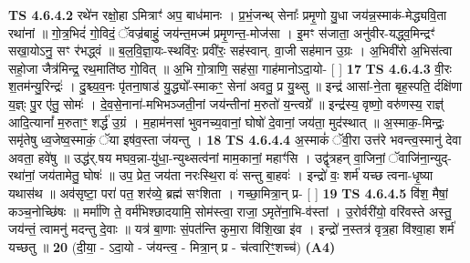 \documentclass[17pt]{extarticle}
\begin{document}
                  \newline
                                \textbf{ TS 4.6.4.2} \newline
                  रथे॑न रक्षो॒हा ऽमित्राꣳ॑ अप॒ बाध॑मानः । प्र॒भं॒जन्थ् सेनाः᳚ प्रमृ॒णो यु॒धा जय॑न्न॒स्माक॑-मेद्ध्यवि॒ता रथा॑नां ॥ गो॒त्र॒भिदं॑ गो॒विदं॒ ॅवज्र॑बाहुं॒ जय॑न्त॒मज्म॑ प्रमृ॒णन्त॒-मोज॑सा । इ॒मꣳ स॑जाता॒ अनु॑वीर-यद्ध्व॒मिन्द्रꣳ॑ सखा॒योऽनु॒ सꣳ र॑भद्ध्वं ॥ ब॒ल॒वि॒ज्ञा॒यः-स्थवि॑रः॒ प्रवी॑रः॒ सह॑स्वान्. वा॒जी सह॑मान उ॒ग्रः । अ॒भिवी॑रो अ॒भिस॑त्वा सहो॒जा जैत्र॑मिन्द्र॒ रथ॒माति॑ष्ठ गो॒वित् ॥ अ॒भि गो॒त्राणि॒ सह॑सा॒ गाह॑मानोऽदा॒यो- [  ] \textbf{  17 } \newline
                  \newline
                                \textbf{ TS 4.6.4.3} \newline
                  वी॒रः श॒तम॑न्यु॒रिन्द्रः॑ । दु॒श्च्य॒व॒नः पृ॑तना॒षाड॑ यु॒द्ध्यो᳚-स्माकꣳ॒॒ सेना॑ अवतु॒ प्र यु॒थ्सु ॥ इन्द्र॑ आसां-ने॒ता बृह॒स्पति॒ र्दक्षि॑णा य॒ज्ञ्ः पु॒र ए॑तु॒ सोमः॑ । दे॒व॒से॒नाना॑-मभिभञ्जती॒नां जय॑न्तीनां म॒रुतो॑ य॒न्त्वग्रे᳚ ॥ इन्द्र॑स्य॒ वृष्णो॒ वरु॑णस्य॒ राज्ञ्॑ आदि॒त्यानां᳚ म॒रुताꣳ॒॒ शर्द्ध॑ उ॒ग्रं । म॒हाम॑नसां भुवनच्य॒वानां॒ घोषो॑ दे॒वानां॒ जय॑ता॒ मुद॑स्थात् ॥ अ॒स्माक॒-मिन्द्रः॒ समृ॑तेषु ध्व॒जेष्व॒स्माकं॒ ॅया इष॑व॒स्ता ज॑यन्तु । \textbf{  18} \newline
                  \newline
                                \textbf{ TS 4.6.4.4} \newline
                  अ॒स्माकं॑ ॅवी॒रा उत्त॑रे भवन्त्व॒स्मानु॑ देवा अवता॒ हवे॑षु ॥ उद्ध॑र्.षय मघव॒न्ना-यु॑धा॒-न्युथ्सत्व॑नां माम॒कानां॒ महाꣳ॑सि । उद्वृ॑त्रहन् वा॒जिनां॒ ॅवाजि॑ना॒न्युद्-रथा॑नां॒ जय॑तामेतु॒ घोषः॑ ॥ उप॒ प्रेत॒ जय॑ता नरःस्थि॒रा वः॑ सन्तु बा॒हवः॑ । इन्द्रो॑ वः॒ शर्म॑ यच्छ त्वना-धृ॒ष्या यथास॑थ ॥ अव॑सृष्टा॒ परा॑ पत॒ शर॑व्ये॒ ब्रह्म॑ सꣳशिता । गच्छा॒मित्रा॒न् प्र- [  ] \textbf{  19} \newline
                  \newline
                                \textbf{ TS 4.6.4.5} \newline
                  वि॑श॒ मैषां॒ कञ्च॒नोच्छि॑षः ॥ मर्मा॑णि ते॒ वर्म॑भिश्छादयामि॒ सोम॑स्त्वा॒ राजा॒ ऽमृते॑ना॒भि-व॑स्तां । उ॒रोर्वरी॑यो॒ वरि॑वस्ते अस्तु॒ जय॑न्तं॒ त्वामनु॑ मदन्तु दे॒वाः ॥ यत्र॑ बा॒णाः सं॒पत॑न्ति कुमा॒रा वि॑शि॒खा इ॑व । इन्द्रो॑ न॒स्तत्र॑ वृत्र॒हा वि॑श्वा॒हा शर्म॑ यच्छतु ॥ \textbf{  20 } \newline
                  \newline
                      (दी॒या॒ - ऽदा॒यो - ज॑यन्त्व॒ - मित्रा॒न् प्र - च॑त्वारिꣳ॒॒शच्च॑)  \textbf{(A4)} \newline \newline
\end{document}
